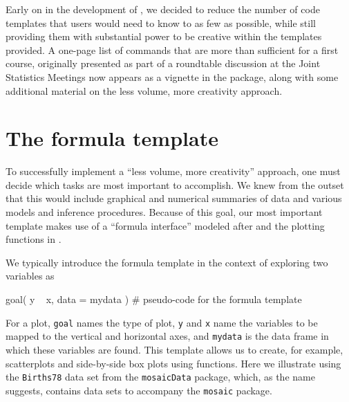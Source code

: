 Early on in the development of , we decided to reduce the
number of code templates that users would need to know to as few as
possible, while still providing them with substantial power to be
creative within the templates provided. A one-page list of commands that
are more than sufficient for a first course, originally presented as
part of a roundtable discussion at the Joint Statistics Meetings
\citep{Pruim:MinimalR:2011} now appears as a vignette in the package,
along with some additional material on the less volume, more creativity
approach.

\section{The formula template}\label{the-formula-template}

To successfully implement a ``less volume, more creativity'' approach,
one must decide which tasks are most important to accomplish. We knew
from the outset that this would include graphical and numerical
summaries of data and various models and inference procedures. Because
of this goal, our most important template makes use of a ``formula
interface'' modeled after  and the plotting functions in
 \citep{lattice}.

We typically introduce the formula template in the context of exploring
two variables as

\begin{Schunk}
\begin{Sinput}
goal( y ~ x, data = mydata )    # pseudo-code for the formula template
\end{Sinput}
\end{Schunk}

\noindent
For a plot, \texttt{goal} names the type of plot, \texttt{y} and
\texttt{x} name the variables to be mapped to the vertical and
horizontal axes, and \texttt{mydata} is the data frame in which these
variables are found. This template allows us to create, for example,
scatterplots and side-by-side box plots using  functions.
Here we illustrate using the \texttt{Births78} data set from the
\texttt{mosaicData} package, which, as the name suggests, contains data
sets to accompany the \texttt{mosaic} package.

